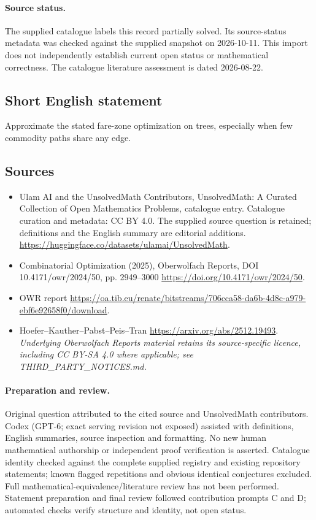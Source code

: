 \documentclass[11pt]{article}
\begin{document}
\paragraph{Source status.}
The supplied catalogue labels this record partially solved. Its source-status metadata was checked against the supplied snapshot on 2026-10-11. This import does not independently establish current open status or mathematical correctness. The catalogue literature assessment is dated 2026-08-22.
\subsection{Short English statement}
Approximate the stated fare-zone optimization on trees, especially when few commodity paths share any edge.
\subsection{Sources}
\begin{itemize}
\item[S1] Ulam AI and the UnsolvedMath Contributors, UnsolvedMath: A Curated Collection of Open Mathematics Problems, catalogue entry. Catalogue curation and metadata: CC BY 4.0. The supplied source question is retained; definitions and the English summary are editorial additions.
\url{https://huggingface.co/datasets/ulamai/UnsolvedMath}.
\item[S2] Combinatorial Optimization (2025), Oberwolfach Reports, DOI 10.4171/owr/2024/50, pp. 2949--3000
\url{https://doi.org/10.4171/owr/2024/50}.
\item[S3] OWR report
\url{https://oa.tib.eu/renate/bitstreams/706cca58-da6b-4d8c-a979-ebf6e92658f0/download}.
\item[S4] Hoefer--Kauther--Pabst--Peis--Tran
\url{https://arxiv.org/abs/2512.19493}.
\textit{Underlying Oberwolfach Reports material retains its source-specific licence, including CC BY-SA 4.0 where applicable; see THIRD\_PARTY\_NOTICES.md.}
\end{itemize}
\paragraph{Preparation and review.}
Original question attributed to the cited source and UnsolvedMath contributors. Codex (GPT-6; exact serving revision not exposed) assisted with definitions, English summaries, source inspection and formatting. No new human mathematical authorship or independent proof verification is asserted. Catalogue identity checked against the complete supplied registry and existing repository statements; known flagged repetitions and obvious identical conjectures excluded. Full mathematical-equivalence/literature review has not been performed. Statement preparation and final review followed contribution prompts C and D; automated checks verify structure and identity, not open status.
\label{end:statement}
\end{document}

